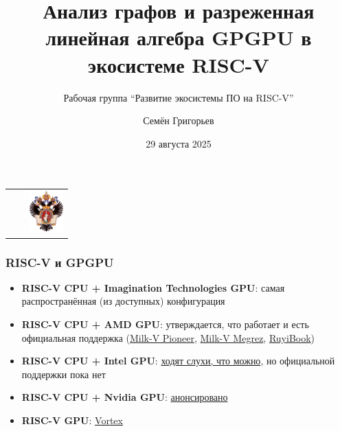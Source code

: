 \documentclass[xcolor=table,aspectratio=169]{beamer}
\title[GraphBLAS+RISC-V+GPGPU]{Анализ графов и разреженная линейная алгебра GPGPU в экосистеме RISC-V}
\subtitle{Рабочая группа ``Развитие экосистемы ПО на RISC-V''}
\institute[СПбГУ]{
Санкт-Петербургский Государственный Университет
}
\author[Семён Григорьев]{Семён Григорьев}
\date{29 августа 2025}
\begin{document}
{
\begin{frame}[fragile]
  \begin{table}
  \centering
  \begin{tabularx}{\linewidth}{XcX}
    \hfill
    & 
    & \hfill \includegraphics[height=1.6cm]{pictures/SPbGU_Logo.png}
  \end{tabularx}
  \end{table}
  \titlepage
\end{frame}
}



\begin{frame}[fragile]
  \frametitle{RISC-V и GPGPU}
  \begin{itemize}
    \item \textbf{RISC-V CPU + Imagination Technologies GPU}: самая распространённая (из доступных) конфигурация
    \item \textbf{RISC-V CPU + AMD GPU}: утверждается, что работает и есть официальная поддержка (\href{https://milkv.io/pioneer}{Milk-V Pioneer}, \href{https://riscv.org/ecosystem-news/2024/10/risc-v-cpu-demoed-with-rx-7900-xtx-gpu-in-debian-linux-amd-flagship-gpu-paired-with-milk-v-megrez-board-and-sifive-p550-cores/}{Milk-V Megrez}, \href{https://milkv.io/ruyibook}{RuyiBook})
    \item \textbf{RISC-V CPU + Intel GPU}: \href{https://www.reddit.com/r/RISCV/comments/1ftep9u/intel_arc_a770_on_riscv/}{ходят слухи, что можно}, но официальной поддержки пока нет
    \item \textbf{RISC-V CPU + Nvidia GPU}: \href{https://riscv.org/ecosystem-news/2025/07/nvidia-to-bring-cuda-platform-support-to-the-risc-v/}{анонсировано}
    \item \textbf{RISC-V GPU}: \href{https://github.com/vortexgpgpu/vortex}{Vortex}
  \end{itemize}
\end{frame}
\end{document}
